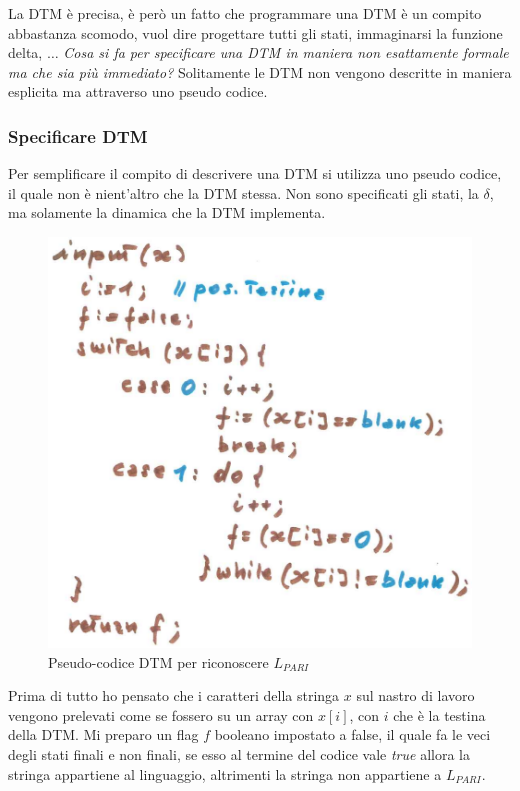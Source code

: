 \documentclass{article}
\begin{document}
La DTM è precisa, è però un fatto che programmare una DTM è un compito abbastanza
scomodo, vuol dire progettare tutti gli stati, immaginarsi la funzione delta, $\dots$
\textit{Cosa si fa per specificare una DTM in maniera non esattamente
    formale ma che sia più immediato?} Solitamente le DTM non vengono descritte
in maniera esplicita ma attraverso uno pseudo codice.

\subsubsection{Specificare DTM}
Per semplificare il compito di descrivere una DTM si utilizza uno pseudo codice,
il quale non è nient'altro che la DTM stessa. Non sono specificati gli stati,
la $\delta$, ma solamente la dinamica che la DTM implementa.

\begin{figure}[H]
    \centering
    \includegraphics[scale=0.5]{images/pseudo_DTM.png}
    \caption{Pseudo-codice DTM per riconoscere $L_{PARI}$}
\end{figure}
Prima di tutto ho pensato che i caratteri della stringa $x$ sul
nastro di lavoro vengono prelevati come se fossero su un array con $x[i]$,
con $i$ che è la testina della DTM. Mi preparo un flag $f$ booleano impostato
a false, il quale fa le veci degli stati finali e non finali, se esso
al termine del codice vale \textit{true} allora
la stringa appartiene al linguaggio, altrimenti la stringa non appartiene
a $L_{PARI}$.
\end{document}
